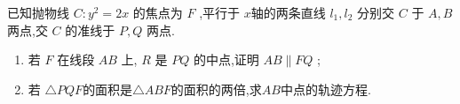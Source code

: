 \documentclass[class=ctexart,crop=false]{standalone}
\begin{document}
    
已知抛物线 $C:y^2=2x$ 的焦点为 $F$ ,平行于 $x$轴的两条直线 $l_1,l_2$ 分别交 $C$ 于 $A,B$ 两点,交 $C$ 的准线于 $P,Q$ 两点.

\begin{enumerate}[label=(\Roman*)]
    \item 若 $F$ 在线段 $AB$ 上, $R$ 是 $PQ$ 的中点,证明 $AB\parallel FQ$ ;
    \item 若 $\triangle PQF$的面积是$\triangle ABF$的面积的两倍,求$AB$中点的轨迹方程.
\end{enumerate}
\end{document}
